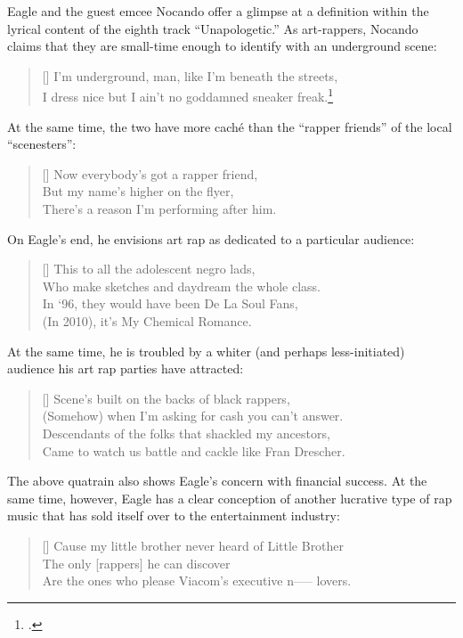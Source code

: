 Eagle and the guest emcee Nocando offer a glimpse at a definition within the lyrical content of
the eighth track ``Unapologetic.'' As art-rappers, Nocando claims that they are small-time enough
to identify with an underground scene:
\settowidth{\versewidth}{I dress nice but I ain't no goddamned sneaker freak.}
    \begin{verse}[\versewidth]
        I'm underground, man, like I'm beneath the streets, \\ 
        I dress nice but I ain't no goddamned sneaker freak.\footnote{
            \cite{openmikeeagle2010}.}
    \end{verse}
At the same time, the two have more caché than the ``rapper friends''  of the local  
``scenesters'':
\settowidth{\versewidth}{There's a reason I'm performing after him.}
    \begin{verse}[\versewidth]
        Now everybody's got a rapper friend, \\ 
        But my name's higher on the flyer,\\
        There's a reason I'm performing after him.
    \end{verse}
On Eagle's end, he envisions art rap as dedicated to a particular audience:
\settowidth{\versewidth}{Who make sketches and daydream the whole class.}
    \begin{verse}[\versewidth]
        This to all the adolescent negro lads, \\
        Who make sketches and daydream the whole class. \\
        In `96, they would have been De La Soul Fans, \\
        (In 2010), it's My Chemical Romance.
    \end{verse}
At the same time, he is troubled by a whiter (and perhaps less-initiated) audience his art rap 
parties have attracted:
\settowidth{\versewidth}{Came to watch us battle and cackle like Fran Drescher.}
    \begin{verse}[\versewidth]
        Scene's built on the backs of black rappers, \\
        (Somehow) when I'm asking for cash you can't answer. \\ 
        Descendants of the folks that shackled my ancestors, \\ 
        Came to watch us battle and cackle like Fran Drescher.
    \end{verse}
The above quatrain also shows Eagle's concern with financial success. At the same time, however, 
Eagle has a clear conception of another lucrative type of rap music that has sold itself over to 
the entertainment  industry:
\settowidth{\versewidth}{Cause my little brother never heard of Little Brother \textellipsis}
    \begin{verse}[\versewidth]
        Cause my little brother never heard of Little Brother \textellipsis \\ 
        The only [rappers] he can discover \\
        Are the ones who please Viacom's executive n----- lovers.
    \end{verse}

